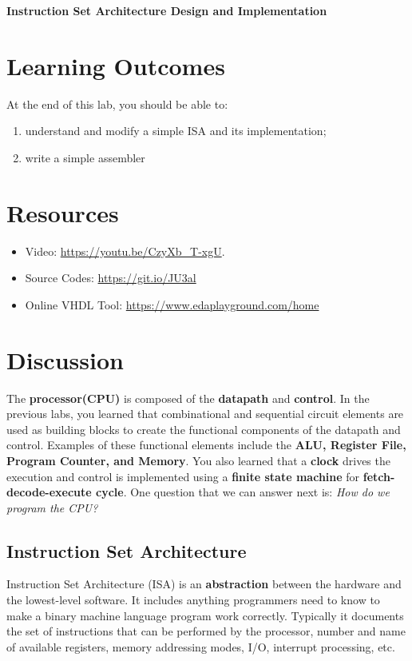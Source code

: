 \documentclass[a4paper, 11pt,oneside]{article}
\begin{document}
\begin{center}
	{\LARGE \textbf{Instruction Set Architecture Design and Implementation}}
\end{center}

\section*{Learning Outcomes}
   At the end of this lab, you should be able to:
   \begin{enumerate}[itemsep=0pt,parsep=0pt]
   	   \item understand and modify a simple ISA and its implementation;
       \item write a simple assembler
   \end{enumerate}   
\tableofcontents

\section{Resources}
\begin{itemize}
	\item Video: \href{https://youtu.be/CzyXb_T-xgU}{https://youtu.be/CzyXb\_T-xgU}.
	\item Source Codes: \href{https://git.io/JU3al}{https://git.io/JU3al}
	\item Online VHDL Tool: \href{https://www.edaplayground.com/home}
	{https://www.edaplayground.com/home}
\end{itemize}	

\section{Discussion}
The \textbf{processor(CPU)} is composed of the \textbf{datapath} and 
\textbf{control}. In the previous labs, you learned that combinational and 
sequential circuit elements are used as building blocks to create the 
functional components of the datapath and control. Examples of these functional 
elements include the \textbf{ALU, Register File, Program Counter, and Memory}. 
You also learned that a \textbf{clock} drives the execution and control is 
implemented using a \textbf{finite state machine} for 
\textbf{fetch-decode-execute cycle}. One question that we can answer next is: 
\textit{How do we program the CPU?}


\subsection{Instruction Set Architecture}
Instruction Set Architecture (ISA) is an \textbf{abstraction} between the 
hardware and the lowest-level software. It includes anything programmers need 
to know to make a binary machine language program work correctly. Typically it  
documents the set of instructions that can be performed by the 
processor, number and name of available registers, memory 
addressing modes, I/O, interrupt processing, etc.
\end{document}
